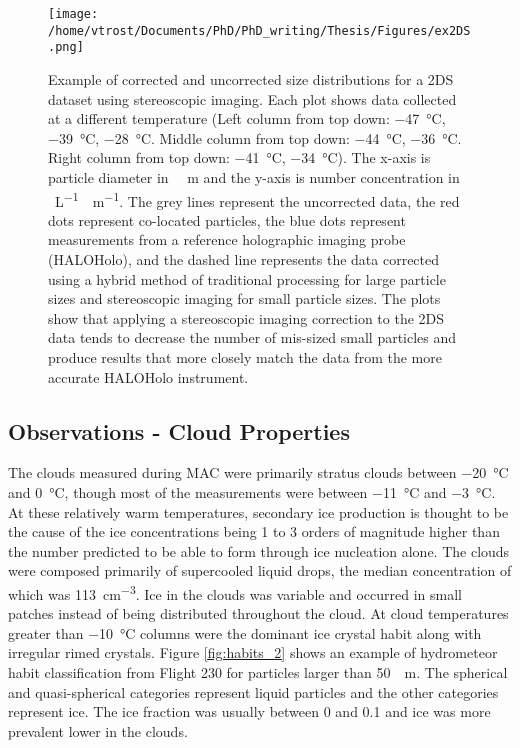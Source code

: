\begin{figure}[H]
	\centering
	\texttt{[image: /home/vtrost/Documents/PhD/PhD\_writing/Thesis/Figures/ex2DS.png]}
	\caption{Example of corrected and uncorrected size distributions for a 2DS dataset using stereoscopic imaging. Each plot shows data collected at a different temperature (Left column from top down: \SI{-47}{\degreeCelsius}, \SI{-39}{\degreeCelsius}, \SI{-28}{\degreeCelsius}. Middle column from top down: \SI{-44}{\degreeCelsius}, \SI{ -36}{\degreeCelsius}. Right column from top down: \SI{-41}{\degreeCelsius}, \SI{-34}{\degreeCelsius}). The x-axis is particle diameter in \SI{}{\mu m} and the y-axis is number concentration in \SI{}{L^{-1} \mu m^{-1}}. The grey lines represent the uncorrected data, the red dots represent co-located particles, the blue dots represent measurements from a reference holographic imaging probe (HALOHolo), and the dashed line represents the data corrected using a hybrid method of traditional processing for large particle sizes and stereoscopic imaging for small particle sizes. The plots show that applying a stereoscopic imaging correction to the 2DS data tends to decrease the number of mis-sized small particles and produce results that more closely match the data from the more accurate HALOHolo instrument. \citep[][Figure 17]{oshea2021}}
	\label{fig:2dsEx}
\end{figure}

\subsection{Observations - Cloud Properties}
The clouds measured during MAC were primarily stratus clouds between \SI{-20}{\degreeCelsius} and \SI{0}{\degreeCelsius}, though most of the measurements were between \SI{-11}{\degreeCelsius} and \SI{-3}{\degreeCelsius}. At these relatively warm temperatures, secondary ice production is thought to be the cause of the ice concentrations being 1 to 3 orders of magnitude higher than the number predicted to be able to form through ice nucleation alone. The clouds were composed primarily of supercooled liquid drops, the median concentration of which was \SI{113}{cm^{-3}}. Ice in the clouds was variable and occurred in small patches instead of being distributed throughout the cloud. At cloud temperatures greater than \SI{-10}{\degreeCelsius} columns were the dominant ice crystal habit along with irregular rimed crystals. Figure \ref{fig:habits_2} shows an example of hydrometeor habit classification from Flight 230 for particles larger than \SI{50}{\mu m}. The spherical and quasi-spherical categories represent liquid particles and the other categories represent ice. The ice fraction was usually between 0 and 0.1 and ice was more prevalent lower in the clouds. \citep{oshea2017}

